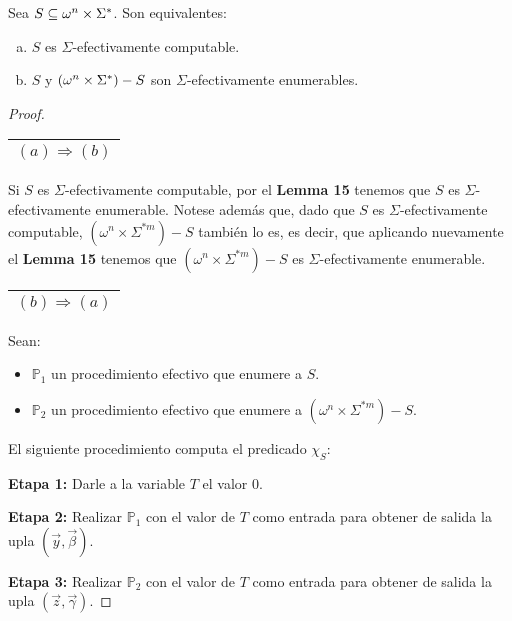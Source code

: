   \pagebreak
  \begin{theorem}
    \par Sea $S \subseteq \omega^{n}\times \Sigma^{\ast}$. Son equivalentes:

    \begin{enumerate}[a)]
      \item $S$ es $\Sigma$-efectivamente computable.
      \item $S$ y $(\omega^{n}\times \Sigma^{\ast})-S$ son $\Sigma$-efectivamente enumerables.
    \end{enumerate}
  \end{theorem}
  \begin{proof}
    \begin{tabular}{|c|}\hline $(a) \Rightarrow (b)$\\\hline\end{tabular} Si $S$ es $\Sigma$-efectivamente computable,
    por el \textbf{Lemma 15} tenemos que $S$ es $\Sigma$-efectivamente enumerable. Notese además que, dado que $S$ es
    $\Sigma$-efectivamente computable, $(\omega^{n} \times \Sigma^{\ast m}) - S$ también lo es, es decir, que aplicando
    nuevamente el \textbf{Lemma 15} tenemos que $(\omega^{n} \times \Sigma^{\ast m})-S$ es
    $\Sigma$-efectivamente enumerable.

    \vspace{3mm}
    \begin{tabular}{|c|}\hline $(b) \Rightarrow (a)$\\\hline\end{tabular} Sean:

    \begin{itemize}
      \item $\mathbb{P}_{1}$ un procedimiento efectivo que enumere a $S$.
      \item $\mathbb{P}_{2}$ un procedimiento efectivo que enumere a $(\omega^{n}\times \Sigma^{\ast m}) - S$.
    \end{itemize}

    \par El siguiente procedimiento computa el predicado $\chi_{S}$:

    \vspace{3mm}
    \textbf{Etapa 1:}
    Darle a la variable $T$ el valor $0$.

    \textbf{Etapa 2:}
    Realizar $\mathbb{P}_{1}$ con el valor de $T$ como entrada para obtener de salida la upla $(\vec{y}, \vec{\beta})$.

    \textbf{Etapa 3:}
    Realizar $\mathbb{P}_{2}$ con el valor de $T$ como entrada para obtener de salida la upla $(\vec{z}, \vec{\gamma})$.


\end{proof}

